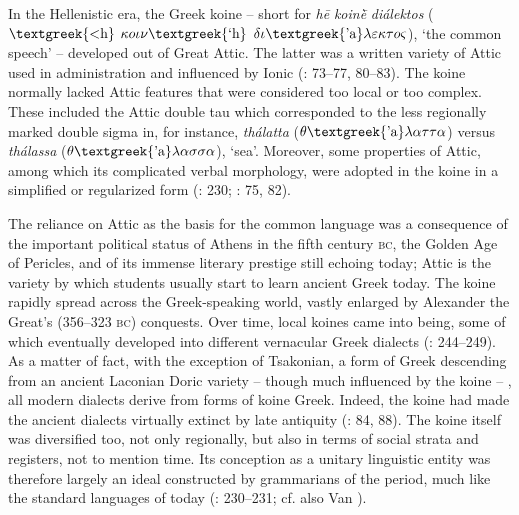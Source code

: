 \documentclass[output=paper]{langsci/langscibook}
\begin{document}
In the Hellenistic era, the Greek koine – short for \textit{hē} \textit{koinḕ} \textit{diálektos} ($\text{\textgreek{<h}}$ $\kappa o\iota \nu \text{\textgreek{`h}}$ $\delta \iota \text{\textgreek{'a}}\lambda \varepsilon \kappa \tau o\varsigma $), ‘the common speech’ – developed out of Great Attic. The latter was a written variety of Attic used in administration and influenced by Ionic (\citealt{Horrocks2010}: 73–77, 80–83). The koine normally lacked Attic features that were considered too local or too complex. These included the Attic double tau which corresponded to the less regionally marked double sigma in, for instance, \textit{thálatta} ($\theta \text{\textgreek{'a}}\lambda \alpha \tau \tau \alpha $) versus \textit{thálassa} ($\theta \text{\textgreek{'a}}\lambda \alpha \sigma \sigma \alpha $), ‘sea’. Moreover, some properties of Attic, among which its complicated verbal morphology, were adopted in the koine in a simplified or regularized form (\citealt{Brixhe2010}: 230; \citealt{Horrocks2010}: 75, 82).

The reliance on Attic as the basis for the common language was a consequence of the important political status of Athens in the fifth century \textsc{bc}, the Golden Age of Pericles, and of its immense literary prestige still echoing today; Attic is the variety by which students usually start to learn ancient Greek today. The koine rapidly spread across the Greek-speaking world, vastly enlarged by Alexander the Great’s (356–323 \textsc{bc}) conquests. Over time, local koines came into being, some of which eventually developed into different vernacular Greek dialects (\citealt{Brixhe2010}: 244–249). As a matter of fact, with the exception of Tsakonian, a form of Greek descending from an ancient Laconian Doric variety – though much influenced by the koine – \citep[88]{Horrocks2010}, all modern dialects derive from forms of koine Greek. Indeed, the koine had made the ancient dialects virtually extinct by late antiquity (\citealt{Horrocks2010}: 84, 88). The koine itself was diversified too, not only regionally, but also in terms of social strata and registers, not to mention time. Its conception as a unitary linguistic entity was therefore largely an ideal constructed by grammarians of the period, much like the standard languages of today (\citealt{Brixhe2010}: 230–231; cf. also Van \citealt{Rooy2016b}).
\end{document}
